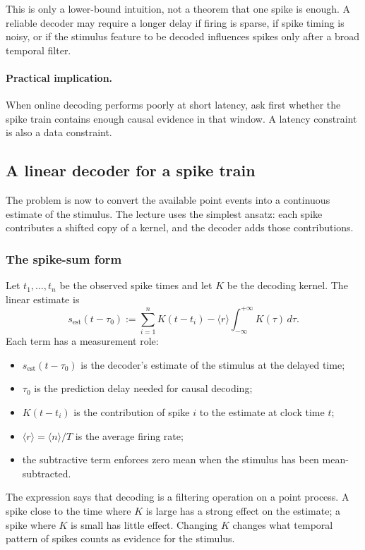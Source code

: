 This is only a lower-bound intuition, not a theorem that one spike is enough. A reliable decoder may require a longer delay if firing is sparse, if spike timing is noisy, or if the stimulus feature to be decoded influences spikes only after a broad temporal filter.

\paragraph{Practical implication.}
When online decoding performs poorly at short latency, ask first whether the spike train contains enough causal evidence in that window. A latency constraint is also a data constraint.

\subsection{A linear decoder for a spike train}

The problem is now to convert the available point events into a continuous estimate of the stimulus. The lecture uses the simplest ansatz: each spike contributes a shifted copy of a kernel, and the decoder adds those contributions.

\subsubsection{The spike-sum form}

Let $t_1,\dots,t_n$ be the observed spike times and let $K$ be the decoding kernel. The linear estimate is
\[
    s_{\mathrm{est}}(t-\tau_0)
    :=
    \sum_{i=1}^{n}K(t-t_i)
    -
    \langle r\rangle
    \int_{-\infty}^{+\infty}K(\tau)\,d\tau .
\]
Each term has a measurement role:
\begin{itemize}
    \item $s_{\mathrm{est}}(t-\tau_0)$ is the decoder's estimate of the stimulus at the delayed time;
    \item $\tau_0$ is the prediction delay needed for causal decoding;
    \item $K(t-t_i)$ is the contribution of spike $i$ to the estimate at clock time $t$;
    \item $\langle r\rangle=\langle n\rangle/T$ is the average firing rate;
    \item the subtractive term enforces zero mean when the stimulus has been mean-subtracted.
\end{itemize}

The expression says that decoding is a filtering operation on a point process. A spike close to the time where $K$ is large has a strong effect on the estimate; a spike where $K$ is small has little effect. Changing $K$ changes what temporal pattern of spikes counts as evidence for the stimulus.

